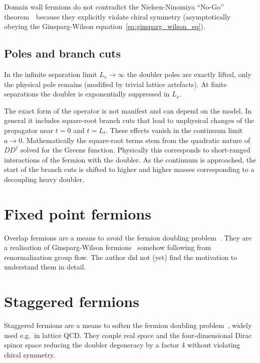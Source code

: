 \documentclass[a4paper]{article}
\newcommand{\nnt}{Nielsen-Ninomiya ``No-Go'' theorem~\cite{NIELSEN1981219}}
\begin{document}
	Domain wall fermions do not contradict the \nnt\ because they explicitly violate chiral symmetry (asymptotically obeying the Ginsparg-Wilson equation~\eqref{eq:ginsparg_wilson_eq}).
	
	\subsection{Poles and branch cuts}
	In the infinite separation limit $L_s\rightarrow\infty$ the doubler poles are exactly lifted, only the physical pole remains (modified by trivial lattice artefacts). At finite separations the doubler is exponentially suppressed in $L_s$.
	
	The exact form of the operator is not manifest and can depend on the model. In general it includes square-root branch cuts that lead to unphysical changes of the propagator near $t=0$ and $t=L_t$. These effects vanish in the continuum limit $a\rightarrow0$. Mathematically the square-root terms stem from the quadratic nature of $DD^\dagger$ solved for the Greens function. Physically this corresponds to short-ranged interactions of the fermion with the doubler. As the continuum is approached, the start of the branch cuts is shifted to higher and higher masses corresponding to a decoupling heavy doubler.
	
	\section{Fixed point fermions}
	Overlap fermions are a means to avoid the fermion doubling problem~\cite{Gattringer:2010zz}. They are a realisation of Ginsparg-Wilson fermions~\cite{Ginsparg_Wilson} somehow following from renormalization group flow. The author did not (yet) find the motivation to understand them in detail.
	
	\section{Staggered fermions}
	Staggered fermions are a means to soften the fermion doubling problem~\cite{staggered_fermions,Gattringer:2010zz}, widely used e.g.\ in lattice QCD. They couple real space and the four-dimensional Dirac spinor space reducing the doubler degeneracy by a factor 4 without violating chiral symmetry.
	
\end{document}
